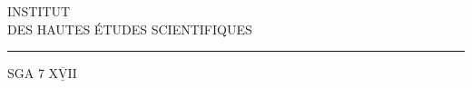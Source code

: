 \begin{center}
INSTITUT\\
DES HAUTES ÉTUDES SCIENTIFIQUES\\[-.3ex]
\rule{1.3cm}{.4pt}
\end{center}

SGA 7 $\underline{\overline{\mathrm{XVII}}}$


